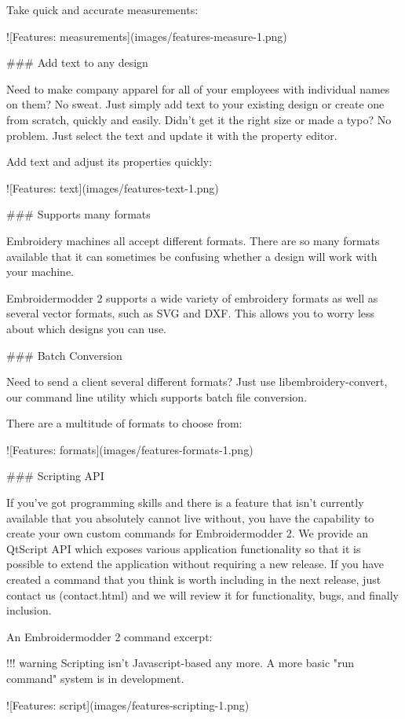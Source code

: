 Take quick and accurate measurements:

![Features: measurements](images/features-measure-1.png)

### Add text to any design

Need to make company apparel for all of your employees with individual names on them? No sweat.
Just simply add text to your existing design or create one from scratch, quickly and easily.
Didn't get it the right size or made a typo? No problem. Just select the text and update it
with the property editor.

Add text and adjust its properties quickly:

![Features: text](images/features-text-1.png)

### Supports many formats

Embroidery machines all accept different formats. There are so many formats
available that it can sometimes be confusing whether a design will work with your machine.

Embroidermodder 2 supports a wide variety of embroidery formats as well as several vector
formats, such as SVG and DXF. This allows you to worry less about which designs you can use.

### Batch Conversion

Need to send a client several different formats? Just use libembroidery-convert, our command
line utility which supports batch file conversion.

There are a multitude of formats to choose from:

![Features: formats](images/features-formats-1.png)

### Scripting API

If you've got programming skills and there is a feature that isn't currently available that you
absolutely cannot live without, you have the capability to create your own custom commands for
Embroidermodder 2. We provide an QtScript API which exposes various application functionality
so that it is possible to extend the application without requiring a new release. If you have
created a command that you think is worth including in the next release, just  contact
us (contact.html) and we will review it for functionality, bugs, and finally inclusion.

An Embroidermodder 2 command excerpt:

!!! warning
    Scripting isn't Javascript-based any more. A more basic "run command" system is in development.

![Features: script](images/features-scripting-1.png)

